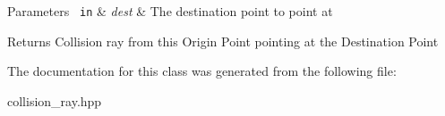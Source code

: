 \begin{DoxyParams}[1]{Parameters}
\mbox{\texttt{ in}}  & {\em dest} & The destination point to point at\\
\hline
\end{DoxyParams}
\begin{DoxyReturn}{Returns}
Collision ray from this Origin Point pointing at the Destination Point 
\end{DoxyReturn}


The documentation for this class was generated from the following file\+:\begin{DoxyCompactItemize}
\item 
collision\+\_\+ray.\+hpp\end{DoxyCompactItemize}
